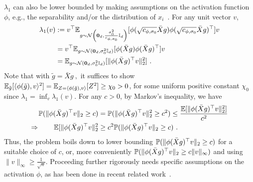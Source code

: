 $\lambda_1$ can also be lower bounded by making assumptions on the activation function $\phi$, e.g., the separability and/or the distribution of $x_i$~\citep{YL-YL:18,ZAZ-YL-ZS:19,oymak2020hermite,ng2021hermite2}. For any unit vector $v$, 
\begin{align*}
\lambda_1(v) & := v^\top \E_{g \sim \cN\left(\bm{0}_{d},\frac{\sigma_0^2}{c_{\phi,\sigma_0}}\I_d\right)}[\phi(\sqrt{c_{\phi,\sigma_0}} \bar{X}g) \phi(\sqrt{c_{\phi,\sigma_0}}  \bar{X}g)^\top] v \\
& = v^\top \E_{g \sim \cN(\bm{0}_d,\sigma_0^2\I_d)}[\phi(\bar{X}g) \phi(\bar{X}g)^\top] v \\
& = \E_{g \sim \cN(\bm{0}_d,\sigma_0^2\I_d)}[ \| \phi(\bar{X}g)^\top v \|_2^2]~.
\end{align*}
Note that with $\tilde{g} = \bar{X}g~, $
it suffices to show $\E_{\tilde{g}}[\langle \phi(\tilde{g}), v \rangle^2] = \E_{Z = \langle \phi(\tilde{g}), v \rangle}[Z^2] \geq \chi_0 > 0$, for some uniform positive constant $\chi_0$ since $\lambda_1 = \inf_v \lambda_1(v)$. For any $c > 0$, by Markov's inequality, we have
\begin{align*}
\P( \| \phi(\bar{X}g)^\top v \|_2 \geq c ) & = \P ( \| \phi(\bar{X}g)^\top v \|_2^2 \geq c^2) \leq \frac{ \E[\| \phi(\bar{X}g)^\top v \|_2^2]}{c^2} \\
\Rightarrow \qquad \E[\| \phi(\bar{X}g)^\top v \|_2^2 & \geq c^2 \P( \| \phi(\bar{X}g)^\top v \|_2 \geq c )~.
\end{align*}
Thus, the problem boils down to lower bounding $\P( \| \phi(\bar{X}g)^\top v \|_2 \geq c )$ for a suitable choice of $c$, or, more conveniently $\P( \| \phi(\bar{X}g)^\top v \|_2 \geq c \|v\|_{\infty} )$ and using $\| v \|_{\infty} \geq \frac{1}{\sqrt{n}}$. Proceeding further rigorously needs specific assumptions on the activation $\phi$, as has been done in recent related work~\citep{oymak2020hermite,ZAZ-YL-ZS:19,YL-YL:18}. 